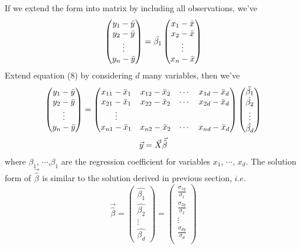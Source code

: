 \documentclass{article}
\begin{document}
If we extend the form into matrix by including all observations, we've
\begin{equation}
    \begin{pmatrix}
    y_1 - \Bar{y} \\
    y_2 - \Bar{y} \\
    \vdots \\
    y_n - \Bar{y}
    \end{pmatrix}
    =
    \hat{\beta_1}  
    \begin{pmatrix}
    x_1 - \Bar{x} \\
    x_2 - \Bar{x} \\
    \vdots \\
    x_n - \Bar{x}
    \end{pmatrix}
\end{equation} Extend equation (8) by considering $d$ many variables, then we've
\begin{gather*}
    \begin{pmatrix}
    y_1 - \Bar{y} \\
    y_2 - \Bar{y} \\
    \vdots \\
    y_n - \Bar{y}
    \end{pmatrix}
    = 
    \begin{pmatrix}
    x_{11} - \Bar{x}_1 & x_{12} - \Bar{x}_2 & \cdots & x_{1d} - \Bar{x}_d \\
    x_{21} - \Bar{x}_1 & x_{22} - \Bar{x}_2 & \cdots & x_{2d} - \Bar{x}_d \\
    \vdots \\
    x_{n1} - \Bar{x}_1 & x_{n2} - \Bar{x}_2 & \cdots & x_{nd} - \Bar{x}_d 
    \end{pmatrix}
    \begin{pmatrix}
    \hat{\beta_1} \\
    \hat{\beta_2} \\
    \vdots  \\
    \hat{\beta_d}
    \end{pmatrix} \\
    \Vec{y} = \Vec{X}\Vec{\hat{\beta}}
\end{gather*} where $\beta_1$, $\cdots$,$\beta_1$ are the regression coefficient for variables $x_1$, $\cdots$, $x_d$. The solution form of $\Vec{\hat{\beta}}$ is similar to the solution derived in previous section, $i.e.$
\begin{equation}
    \Vec{\hat{\beta}} = 
     \begin{pmatrix}
    \hat{\beta_1} \\
    \hat{\beta_2} \\
    \vdots  \\
    \hat{\beta_d}
    \end{pmatrix}
    =
    \begin{pmatrix}
    \frac{\sigma_{1y}}{\sigma_1} \\
    \frac{\sigma_{2y}}{\sigma_2} \\
    \vdots \\
    \frac{\sigma_{dy}}{\sigma_d} \\
    \end{pmatrix}
\end{equation}
\end{document}
